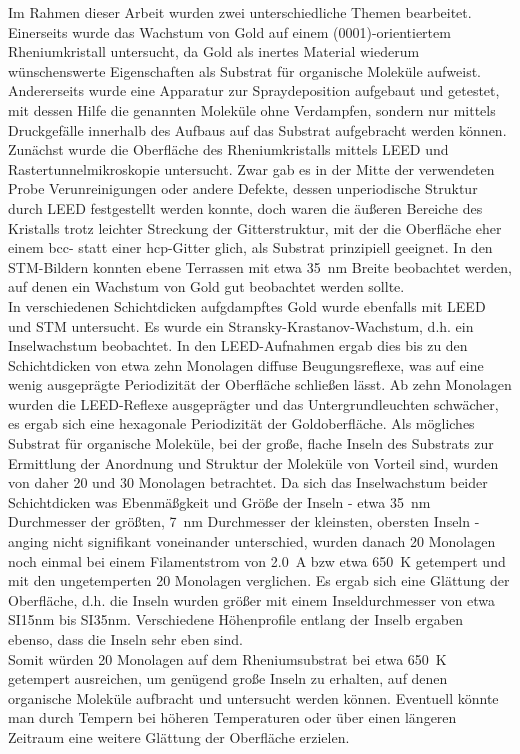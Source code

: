 Im Rahmen dieser Arbeit wurden zwei unterschiedliche Themen bearbeitet. Einerseits wurde das
Wachstum von Gold auf einem (0001)-orientiertem Rheniumkristall untersucht, da Gold als
inertes Material wiederum wünschenswerte Eigenschaften als Substrat für organische Moleküle
aufweist. Andererseits wurde eine Apparatur zur Spraydeposition aufgebaut und getestet, mit
dessen Hilfe die genannten Moleküle ohne Verdampfen, sondern nur mittels Druckgefälle innerhalb
des Aufbaus auf das Substrat aufgebracht werden können.
\\
Zunächst wurde die Oberfläche des Rheniumkristalls mittels LEED und Rastertunnelmikroskopie
untersucht. Zwar gab es in der Mitte der verwendeten Probe Verunreinigungen oder andere Defekte,
dessen unperiodische Struktur durch LEED festgestellt werden konnte, doch waren die äußeren Bereiche
des Kristalls trotz leichter Streckung der Gitterstruktur, mit der die Oberfläche eher einem bcc-
statt einer hcp-Gitter glich, als Substrat prinzipiell geeignet. In den STM-Bildern konnten ebene
Terrassen mit etwa \SI{35}{nm} Breite beobachtet werden, auf denen ein Wachstum von Gold gut
beobachtet werden sollte.
\\
In verschiedenen Schichtdicken aufgdampftes Gold wurde ebenfalls mit LEED und STM untersucht. Es
wurde ein Stransky-Krastanov-Wachstum, d.h. ein Inselwachstum beobachtet. In den LEED-Aufnahmen
ergab dies bis zu den Schichtdicken von etwa zehn Monolagen diffuse Beugungsreflexe, was auf eine
wenig ausgeprägte Periodizität der Oberfläche schließen lässt. Ab zehn Monolagen wurden die
LEED-Reflexe ausgeprägter und das Untergrundleuchten schwächer, es ergab sich eine hexagonale
Periodizität der Goldoberfläche. Als mögliches Substrat für organische Moleküle, bei der große,
flache Inseln des Substrats zur Ermittlung der Anordnung und Struktur der Moleküle von Vorteil sind,
wurden von daher 20 und 30 Monolagen betrachtet. Da sich das Inselwachstum beider Schichtdicken was Ebenmäßgkeit und Größe
der Inseln - etwa \SI{35}{nm} Durchmesser der größten, 
\SI{7}{nm} Durchmesser der kleinsten, obersten Inseln - anging nicht signifikant voneinander
unterschied, wurden danach 20 Monolagen noch einmal bei einem Filamentstrom von
\SI{2,0}{A} bzw etwa \SI{650}{K} getempert und mit den ungetemperten 20 Monolagen verglichen. Es
ergab sich eine Glättung der Oberfläche, d.h. die Inseln wurden größer mit einem Inseldurchmesser
von etwa SI{15}{nm} bis SI{35}{nm}. Verschiedene Höhenprofile entlang der Inselb ergaben ebenso,
dass die Inseln sehr eben sind.
\\
Somit würden 20 Monolagen auf dem Rheniumsubstrat bei etwa \SI{650}{K} getempert ausreichen, um
genügend große Inseln zu erhalten, auf denen organische Moleküle aufbracht und untersucht werden
können. Eventuell könnte man durch Tempern bei höheren Temperaturen oder über einen längeren
Zeitraum eine weitere Glättung der Oberfläche erzielen.
\\




